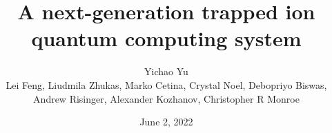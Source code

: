 \documentclass{beamer}
\title[EURIQA Brassboard]{A next-generation trapped ion quantum computing system}
\date{June 2, 2022}
\author[Yichao Yu]{Yichao Yu\\
  \vspace{0.5cm}
  {\footnotesize Lei Feng, Liudmila Zhukas, Marko Cetina, Crystal Noel, Debopriyo Biswas,}\\
  {\footnotesize Andrew Risinger, Alexander Kozhanov, Christopher R Monroe}}
\institute[Duke Quantum Center]{Monroe Group/Duke Quantum Center}
\begin{document}




{
  \begin{frame}{}
    \titlepage
  \end{frame}
}


\end{document}
